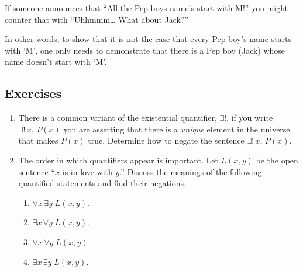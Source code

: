\documentclass[10pt,]{book}
\theoremstyle{plain}
\theoremstyle{definition}
\theoremstyle{definition}
\numberwithin{equation}{section}
\newcommand{\hint}[1]{ }
\begin{document}
    If someone announces that ``All the Pep boys name's start with M!'' you might counter that
    with ``Uhhmmm\dots{} What about Jack?''
\par

    In other words, to show that it is not the case that every Pep boy's name starts
    with `M', one only needs to demonstrate that there is a Pep boy (Jack) whose
    name doesn't start with `M'.
\typeout{************************************************}
\typeout{************************************************}
\subsection[{Exercises}]{Exercises}\label{exercises-12}
\leavevmode%
\begin{enumerate}[label=(\alph*)]
\item\hypertarget{li-177}{}
        There is a common variant of the existential quantifier,
        \(\exists !\), if you write \(\exists ! \, x, \, P(x)\) you are asserting 
        that there is a \emph{unique} element 
        in the universe that makes \(P(x)\) true.
        Determine how to negate the sentence \(\exists ! \, x, \, P(x)\).



        \hint{
        Unique existence is essentially saying that there is exactly 1 element of the universe of discourse that makes P(x) true. The negation of "there is exactly 1" is "there's either none, or at least 2".

        Is that enough of a hint?
        }
\item\hypertarget{li-178}{}
    The order in which quantifiers appear is important.  Let \(L(x,y)\)
    be the open sentence ``\(x\) is in love with \(y\).''  Discuss the meanings of the
    following quantified statements and find their negations.

\begin{enumerate}[label=\roman*.]
\item\hypertarget{li-179}{}
          \(\forall x \, \exists y \; L(x,y)\).
\item\hypertarget{li-180}{}
          \(\exists x \, \forall y \; L(x, y)\).
\item\hypertarget{li-181}{}
          \(\forall x \, \forall y \; L(x, y)\).
\item\hypertarget{li-182}{}
          \(\exists x \, \exists y \; L(x, y)\).
\end{enumerate}


\end{enumerate}
\end{document}
